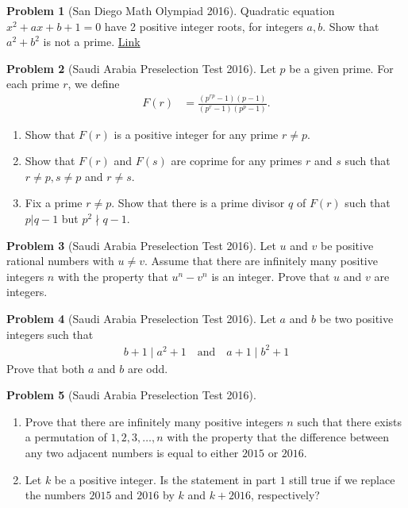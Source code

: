 \documentclass[]{article}
\theoremstyle{definition}
\newtheorem{problem}{Problem}
\begin{document}
\begin{problem}[San Diego Math Olympiad 2016]
	Quadratic equation $ x^2+ax+b+1=0$ have 2 positive integer roots, for integers $ a,b$. Show that $ a^2+b^2$ is not a prime. \hfill \href{http://artofproblemsolving.com/community/c6h307428p1660713}{Link}
\end{problem}



\begin{problem}[Saudi Arabia Preselection Test 2016]
	Let $p$ be a given prime. For each prime $r$, we define
		\begin{align*}
			F(r) &= \frac{(p^{rp} -1)(p-1)}{(p^r-1)(p^p-1)}.
		\end{align*}
	\begin{enumerate}
		\item Show that $F(r)$ is a positive integer for any prime $r \neq p$.
		\item Show that $F(r)$ and $F(s)$ are coprime for any primes $r$ and $s$ such that $r \neq p, s\neq p$ and $r \neq s$.
		\item Fix a prime $r \neq p$. Show that there is a prime divisor $q$ of $F(r)$ such that $p |q - 1$ but $p^2 \nmid q - 1$.
	\end{enumerate}
\end{problem}


\begin{problem}[Saudi Arabia Preselection Test 2016]
	Let $u$ and $v$ be positive rational numbers with $u \neq v$. Assume that there are infinitely many positive integers $n$ with the property that $u^n - v^n$ is an integer. Prove that $u$ and $v$ are integers.
\end{problem}


\begin{problem}[Saudi Arabia Preselection Test 2016]
	Let $a$ and $b$ be two positive integers such that
		\begin{align*}
			b + 1 \mid a^2 + 1 \quad \text{and} \quad a + 1 \mid b^2 + 1
		\end{align*}
	Prove that both $a$ and $b$ are odd.
\end{problem}


\begin{problem}[Saudi Arabia Preselection Test 2016]
	$ $
	\begin{enumerate}
		\item Prove that there are infinitely many positive integers $n$ such that there exists a permutation of $1, 2,3, \dots, n$ with the property that the difference between any two adjacent numbers is equal to either $2015$ or $2016$.
		\item Let $k$ be a positive integer. Is the statement in part $1$ still true if we replace the numbers $2015$ and $2016$ by $k$ and $k + 2016$, respectively?
	\end{enumerate}
\end{problem}
\end{document}
